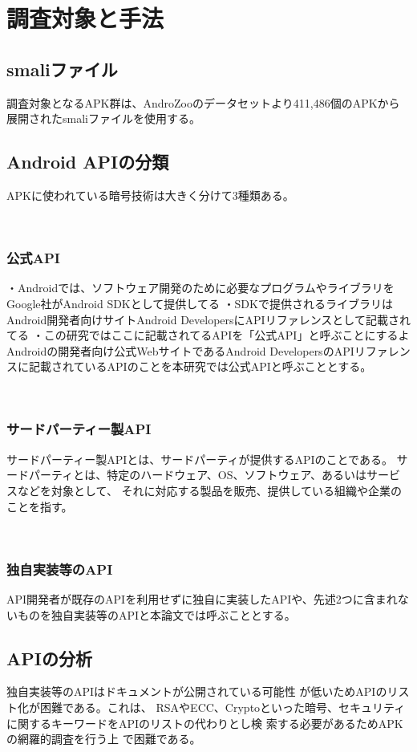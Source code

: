 \newpage
\section{調査対象と手法}
\subsection {smaliファイル}

調査対象となるAPK群は、AndroZoo\cite{}のデータセットより411,486個のAPKから展開されたsmaliファイルを使用する。

\subsection{Android APIの分類}
APKに使われている暗号技術は大きく分けて3種類ある。

　\subsubsection {公式API}

・Androidでは、ソフトウェア開発のために必要なプログラムやライブラリをGoogle社がAndroid SDKとして提供してる
・SDKで提供されるライブラリはAndroid開発者向けサイトAndroid DevelopersにAPIリファレンスとして記載されてる
・この研究ではここに記載されてるAPIを「公式API」と呼ぶことにするよ
\fi
Androidの開発者向け公式WebサイトであるAndroid DevelopersのAPIリファレンスに記載されているAPIのことを本研究では公式APIと呼ぶこととする。

　\subsubsection {サードパーティー製API}
サードパーティー製APIとは、サードパーティが提供するAPIのことである。
サードパーティとは、特定のハードウェア、OS、ソフトウェア、あるいはサービスなどを対象として、
それに対応する製品を販売、提供している組織や企業のことを指す。

　\subsubsection {独自実装等のAPI}
API開発者が既存のAPIを利用せずに独自に実装したAPIや、先述2つに含まれないものを独自実装等のAPIと本論文では呼ぶこととする。

\subsection{APIの分析}
独自実装等のAPIはドキュメントが公開されている可能性
が低いためAPIのリスト化が困難である。これは、
RSAやECC、Cryptoといった暗号、セキュリティ
に関するキーワードをAPIのリストの代わりとし検
索する必要があるためAPKの網羅的調査を行う上
で困難である。

